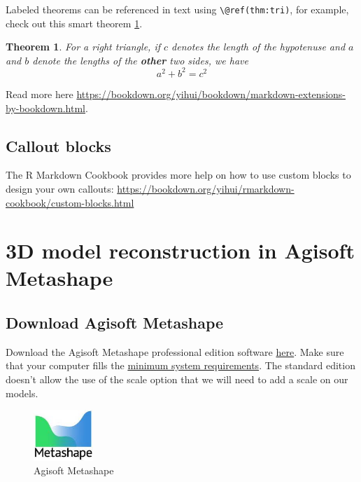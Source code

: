 \documentclass[
]{book}
\newtheorem{theorem}{Theorem}[chapter]
\theoremstyle{definition}
\theoremstyle{definition}
\theoremstyle{definition}
\theoremstyle{definition}
\theoremstyle{remark}
\begin{document}
Labeled theorems can be referenced in text using \texttt{\textbackslash{}@ref(thm:tri)}, for example, check out this smart theorem \ref{thm:tri}.

\begin{theorem}
\protect\hypertarget{thm:tri}{}\label{thm:tri}For a right triangle, if \(c\) denotes the \emph{length} of the hypotenuse
and \(a\) and \(b\) denote the lengths of the \textbf{other} two sides, we have
\[a^2 + b^2 = c^2\]
\end{theorem}

Read more here \url{https://bookdown.org/yihui/bookdown/markdown-extensions-by-bookdown.html}.

\hypertarget{callout-blocks}{%
\section{Callout blocks}\label{callout-blocks}}

The R Markdown Cookbook provides more help on how to use custom blocks to design your own callouts: \url{https://bookdown.org/yihui/rmarkdown-cookbook/custom-blocks.html}

\hypertarget{d-model-reconstruction-in-agisoft-metashape}{%
\chapter{3D model reconstruction in Agisoft Metashape}\label{d-model-reconstruction-in-agisoft-metashape}}

\hypertarget{download-agisoft-metashape}{%
\section{Download Agisoft Metashape}\label{download-agisoft-metashape}}

Download the Agisoft Metashape professional edition software
\href{https://www.agisoft.com/downloads/installer/}{here}. Make sure that
your computer fills the \href{https://www.agisoft.com/downloads/system-requirements/}{minimum system
requirements}.
The standard edition doesn't allow the use of the scale option that we
will need to add a scale on our models.

\begin{figure}
\centering
\includegraphics[width=0.2\textwidth,height=\textheight]{Figures/logo_metashape.jpeg}
\caption{Agisoft Metashape}
\end{figure}
\end{document}
